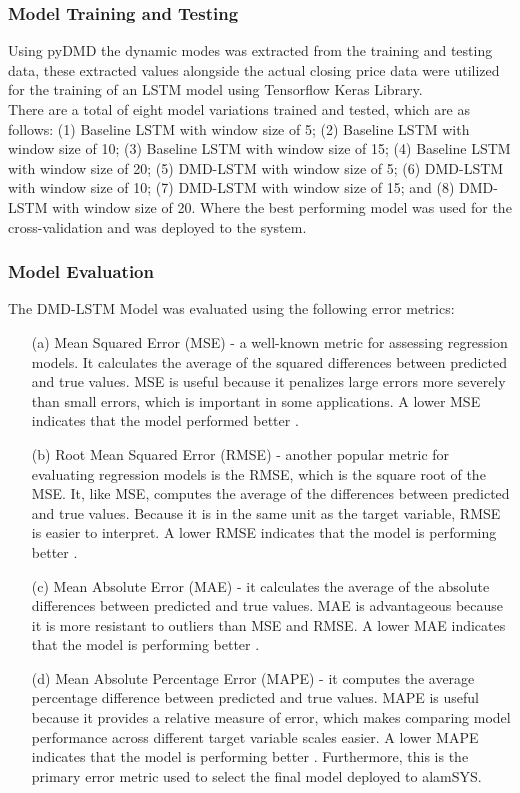 \subsubsection{Model Training and Testing}
\label{subsubsec:model_training_testing}
Using pyDMD the dynamic modes was extracted from the training and testing data,
these extracted values alongside the actual closing price data were utilized for
the training of an LSTM model using Tensorflow Keras Library.
\hfill \\

There are a total of eight model variations trained and tested, which are as follows:
(1) Baseline LSTM with window size of 5;
(2) Baseline LSTM with window size of 10;
(3) Baseline LSTM with window size of 15;
(4) Baseline LSTM with window size of 20;
(5) DMD-LSTM with window size of 5;
(6) DMD-LSTM with window size of 10;
(7) DMD-LSTM with window size of 15; and
(8) DMD-LSTM with window size of 20.
Where the best performing model was used for the cross-validation and was deployed to the system.

\subsubsection{Model Evaluation}
\label{subsubsec:model_evaluation}
The DMD-LSTM Model was evaluated using the following error metrics:
\begin{itemize}
    \item[(a)] Mean Squared Error (MSE) - a well-known metric for assessing regression models. 
    It calculates the average of the squared differences between predicted and true values. 
    MSE is useful because it penalizes large errors more severely than small errors, 
    which is important in some applications. A lower MSE indicates that the model performed better
    \cite{StephMSE}.
    \item[(b)] Root Mean Squared Error (RMSE) - another popular metric for evaluating regression models 
    is the RMSE, which is the square root of the MSE. It, like MSE, computes the average of the 
    differences between predicted and true values. Because it is in the same unit as the target variable, 
    RMSE is easier to interpret. A lower RMSE indicates that the model is performing better
    \cite{StephRMSE}.
    \item[(c)] Mean Absolute Error (MAE) - it calculates the average of the absolute differences 
    between predicted and true values. MAE is advantageous because it is more resistant to 
    outliers than MSE and RMSE. A lower MAE indicates that the model is performing better
    \cite{SecretDataScientistMAE}.
    \item[(d)] Mean Absolute Percentage Error (MAPE) - it computes the average percentage difference 
    between predicted and true values. MAPE is useful because it provides a relative measure of error, 
    which makes comparing model performance across different target variable scales easier. 
    A lower MAPE indicates that the model is performing better
    \cite{Allwright2022MAPE}.
    Furthermore, this is the primary error metric used to select the final model deployed to alamSYS.
\end{itemize}

